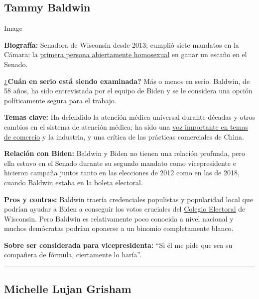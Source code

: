 \hypertarget{tammy-baldwin}{%
\subsection{Tammy Baldwin}\label{tammy-baldwin}}

Image

\textbf{Biografía:} Senadora de Wisconsin desde 2013; cumplió siete
mandatos en la Cámara; la
\href{https://www.nytimes3xbfgragh.onion/2012/11/04/fashion/tammy-baldwin-on-the-edge-of-making-history.html}{primera
persona abiertamente homosexual} en ganar un escaño en el Senado.

\textbf{¿Cuán en serio está siendo examinada?} Más o menos en serio.
Baldwin, de 58 años, ha sido entrevistada por el equipo de Biden y se le
considera una opción políticamente segura para el trabajo.

\textbf{Temas clave:} Ha defendido la atención médica universal durante
décadas y otros cambios en el sistema de atención médica; ha sido una
\href{https://www.nytimes3xbfgragh.onion/2017/08/02/us/politics/senate-democrats-seek-to-outdo-trump-on-trade.html}{voz
importante en temas de comercio} y la industria, y una crítica de las
prácticas comerciales de China.

\textbf{Relación con Biden:} Baldwin y Biden no tienen una relación
profunda, pero ella estuvo en el Senado durante su segundo mandato como
vicepresidente e hicieron campaña juntos tanto en las elecciones de 2012
como en las de 2018, cuando Baldwin estaba en la boleta electoral.

\textbf{Pros y contras:} Baldwin traería credenciales populistas y
popularidad local que podrían ayudar a Biden a conseguir los votos
cruciales del
\href{https://www.nytimes3xbfgragh.onion/es/2016/11/08/espanol/claves-para-entender-el-colegio-electoral-y-seguir-la-eleccion-en-estados-unidos.html}{Colegio
Electoral} de Wisconsin. Pero Baldwin es relativamente poco conocida a
nivel nacional y muchos demócratas podrían oponerse a un binomio
completamente blanco.

\textbf{Sobre ser considerada para vicepresidenta:} ``Si él me pide que
sea su compañera de fórmula, ciertamente lo haría''.

\begin{center}\rule{0.5\linewidth}{\linethickness}\end{center}

\hypertarget{michelle-lujan-grisham}{%
\subsection{Michelle Lujan Grisham}\label{michelle-lujan-grisham}}

